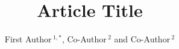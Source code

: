 \documentclass{frontiersSCNS} %
\def\firstAuthorLast{Sample {et~al.}} %
\def\Authors{First Author\,$^{1,*}$, Co-Author\,$^{2}$ and Co-Author\,$^2$}
\begin{document}
\onecolumn
{}

\title[Running Title]{Article Title}
\author[\firstAuthorLast ]{\Authors}
\address{}
\correspondance{}
\extraAuth{}%
\topic{}%

\maketitle

\end{document}
